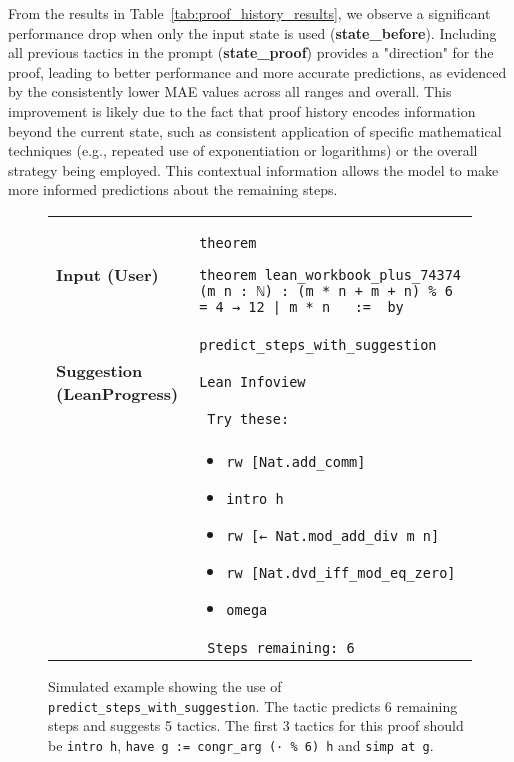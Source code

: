 From the results in Table~\ref{tab:proof_history_results}, we observe a significant performance drop when only the input state is used (\textbf{state\_before}). Including all previous tactics in the prompt (\textbf{state\_proof}) provides a "direction" for the proof, leading to better performance and more accurate predictions, as evidenced by the consistently lower MAE values across all ranges and overall. This improvement is likely due to the fact that proof history encodes information beyond the current state, such as consistent application of specific mathematical techniques (e.g., repeated use of exponentiation or logarithms) or the overall strategy being employed. This contextual information allows the model to make more informed predictions about the remaining steps.

\begin{figure*}[!h]
\centering
\begin{tabular}{p{}p{}}
\toprule
\textbf{Input (User)} & \texttt{theorem}
 \begin{lstlisting}[language=Lean]
 theorem lean_workbook_plus_74374 (m n : ℕ) : (m * n + m + n) % 6 = 4 → 12 | m * n   :=  by
 \end{lstlisting}\\
& \texttt{predict\_steps\_with\_suggestion} \\
\midrule
\textbf{Suggestion (LeanProgress)} & \texttt{Lean Infoview} \\

& \texttt{      Try these:} \\
& \begin{itemize}
    \item \texttt{rw [Nat.add\_comm]}
    \item \texttt{intro h}
    \item \texttt{rw [← Nat.mod\_add\_div m n]}
    \item \texttt{rw [Nat.dvd\_iff\_mod\_eq\_zero]}
    \item \texttt{omega}
\end{itemize} \\
& \texttt{      Steps remaining: 6} \\
\bottomrule
\end{tabular}
\caption{Simulated example showing the use of \texttt{predict\_steps\_with\_suggestion}. The tactic predicts 6 remaining steps and suggests 5 tactics. The first 3 tactics for this proof should be \texttt{intro h}, \texttt{have g := congr\_arg (· \% 6) h} and \texttt{simp at g}.}
\label{fig:qualitative_example}
\end{figure*}

